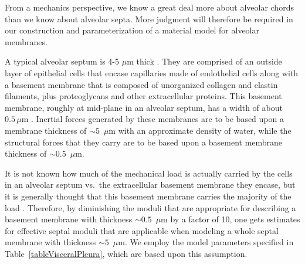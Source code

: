 From a mechanics perspective, we know a great deal more about alveolar chords than we know about alveolar septa.  More judgment will therefore be required in our construction and parameterization of a material model for alveolar membranes.  

A typical alveolar septum is 4-5 $\mu$m thick \cite{Sukietal11}.  They are comprised of an outside layer of epithelial cells that encase capillaries made of endothelial cells along with a basement membrane that is composed of unorganized collagen and elastin filaments, plus proteoglycans and other extracellular proteins.  This basement membrane, roughly at mid-plane in an alveolar septum, has a width of about $0.5 \, \mu$m \cite{RoanWaters11}.  Inertial forces generated by these membranes are to be based upon a membrane thickness of $\sim\!\!5$~$\mu$m with an approximate density of water, while the structural forces that they carry are to be based upon a basement membrane thickness of $\sim\!\! 0.5$~$\mu$m.  

It is not known how much of the mechanical load is actually carried by the cells in an alveolar septum vs.\ the extracellular basement membrane they encase, but it is generally thought that this basement membrane carries the majority of the load \cite{Sukietal11}.  Therefore, by diminishing the moduli that are appropriate for describing a basement membrane with thickness $\sim\!\! 0.5$~$\mu$m by a factor of 10, one gets estimates for effective septal moduli that are applicable when modeling a whole septal membrane with thickness $\sim\!\! 5$~$\mu$m.  We employ the model parameters specified in Table~\ref{tableVisceralPleura}, which are based upon this assumption.

